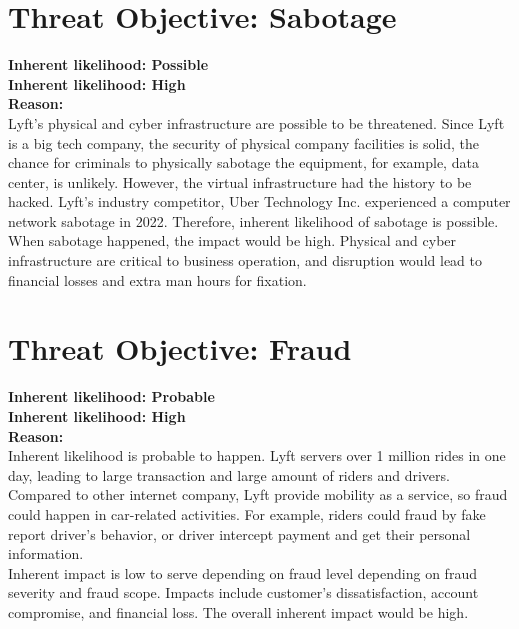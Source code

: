 \documentclass[11pt]{article}
\begin{document}
\section{Threat Objective: Sabotage}


\begin{boxB}
    \textbf{Inherent likelihood: Possible}\\
    \textbf{Inherent likelihood: High}\\
    
    \textbf{Reason: }\\

    Lyft's physical and cyber infrastructure are possible to be threatened. Since Lyft is a big tech company, the security of physical company facilities is solid, the chance for criminals to physically sabotage the equipment, for example, data center, is unlikely. However, the virtual infrastructure had the history to be hacked. Lyft's industry competitor, Uber Technology Inc. experienced a computer network sabotage in 2022\cite{Conger_Roose_2022}. Therefore, inherent likelihood of sabotage is possible.\\

    When sabotage happened, the impact would be high. Physical and cyber infrastructure are critical to business operation, and disruption would lead to financial losses and extra man hours for fixation.

\end{boxB}




\section{Threat Objective: Fraud}


\begin{boxB}


    \textbf{Inherent likelihood: Probable}\\
    \textbf{Inherent likelihood: High}\\

    \textbf{Reason:}\\

    Inherent likelihood is probable to happen. Lyft servers over 1 million rides in one day, leading to large transaction and large amount of riders and drivers. Compared to other internet company, Lyft provide mobility as a service, so fraud could happen in car-related activities. For example, riders could fraud by fake report driver's behavior, or driver intercept payment and get their personal information. \\

    Inherent impact is low to serve depending on fraud level depending on fraud severity and  fraud scope. Impacts include customer's dissatisfaction, account compromise, and financial loss. The overall inherent  impact would be high.
    
\end{boxB}
\end{document}
